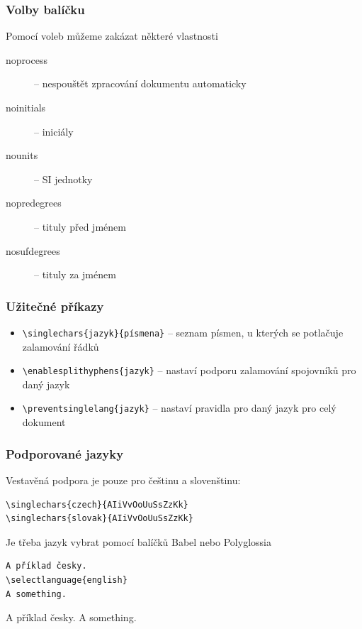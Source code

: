 \begin{frame}
  \frametitle{Volby balíčku}
  Pomocí voleb můžeme zakázat některé vlastnosti
  \begin{description}
    \item [noprocess] – nespouštět zpracování dokumentu automaticky
    \item [noinitials] – iniciály
    \item [nounits] – SI jednotky
    \item [nopredegrees] – tituly před jménem
    \item [nosufdegrees] – tituly za jménem
  \end{description}
\end{frame}

\begin{frame}[fragile]
  \frametitle{Užitečné příkazy}
  \begin{itemize}
    \item \verb|\singlechars{jazyk}{písmena}| -- seznam písmen, u kterých se potlačuje zalamování řádků

    \item \verb|\enablesplithyphens{jazyk}| -- nastaví podporu zalamování spojovníků pro daný jazyk
    \item \verb|\preventsinglelang{jazyk}| -- nastaví pravidla pro daný jazyk pro celý dokument
  \end{itemize}
\end{frame}

\begin{frame}[fragile]
  \frametitle{Podporované jazyky}
  Vestavěná podpora je pouze pro češtinu a slovenštinu:

\begin{verbatim}
\singlechars{czech}{AIiVvOoUuSsZzKk}
\singlechars{slovak}{AIiVvOoUuSsZzKk}
\end{verbatim}

Je třeba jazyk vybrat pomocí balíčků Babel nebo Polyglossia

\begin{verbatim}
A příklad česky.
\selectlanguage{english}
A something.
\end{verbatim}

    \preventsingledebugon

A příklad česky.
A something.

    \preventsingledebugoff


\end{frame}

